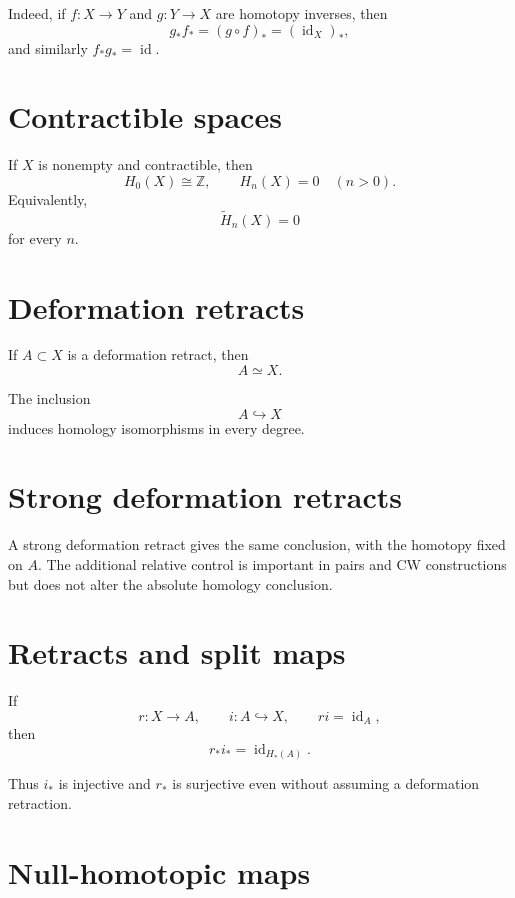 Indeed, if \(f:X\to Y\) and \(g:Y\to X\) are homotopy inverses, then
\[
g_*f_*=(g\circ f)_*=(\operatorname{id}_X)_*,
\]
and similarly \(f_*g_*=\operatorname{id}\).

\section{Contractible spaces}

\begin{corollary}
\label{cor:viii20-contractible}
If \(X\) is nonempty and contractible, then
\[
H_0(X)\cong\mathbb Z,
\qquad
H_n(X)=0\quad(n>0).
\]
Equivalently,
\[
\widetilde H_n(X)=0
\]
for every \(n\).
\end{corollary}

\section{Deformation retracts}

If \(A\subset X\) is a deformation retract, then
\[
A\simeq X.
\]

\begin{corollary}
\label{cor:viii20-deformation-retract}
The inclusion
\[
A\hookrightarrow X
\]
induces homology isomorphisms in every degree.
\end{corollary}

\section{Strong deformation retracts}

A strong deformation retract gives the same conclusion, with the homotopy fixed
on \(A\).  The additional relative control is important in pairs and CW
constructions but does not alter the absolute homology conclusion.

\section{Retracts and split maps}

If
\[
r:X\to A,
\qquad
i:A\hookrightarrow X,
\qquad
r i=\operatorname{id}_A,
\]
then
\[
r_* i_*=\operatorname{id}_{H_*(A)}.
\]

Thus \(i_*\) is injective and \(r_*\) is surjective even without assuming a
deformation retraction.

\section{Null-homotopic maps}

